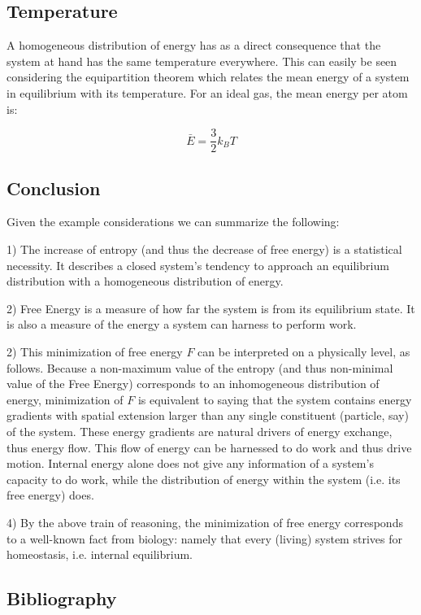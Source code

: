 \subsection{Temperature}

A homogeneous distribution of energy has as a direct consequence that the system at hand has the same temperature everywhere. This can easily be seen considering the equipartition theorem which relates the mean energy of a system in equilibrium with its temperature. For an ideal gas, the mean energy per atom is:

$$\bar{E} = \frac{3}{2}k_BT$$



\subsection{Conclusion}

Given the example considerations we can summarize the following:

1) The increase of entropy (and thus the decrease of free energy) is a statistical necessity. It describes a closed system's tendency to approach an equilibrium distribution with a homogeneous distribution of energy.

2) Free Energy is a measure of how far the system is from its equilibrium state. It is also a measure of the energy a system can harness to perform work.

2) This minimization of free energy $F$ can be interpreted on a physically level, as follows. Because a non-maximum value of the entropy (and thus non-minimal value of the Free Energy) corresponds to an inhomogeneous distribution of energy, minimization of $F$ is equivalent to saying that the system contains energy gradients with spatial extension larger than any single constituent (particle, say) of the system. These energy gradients are natural drivers of energy exchange, thus energy flow. This flow of energy can be harnessed to do work and thus drive motion. Internal energy alone does not give any information of a system's capacity to do work, while the distribution of energy within the system (i.e. its free energy) does.

4) By the above train of reasoning, the minimization of free energy corresponds to a well-known fact from biology: namely that every (living) system strives for homeostasis, i.e. internal equilibrium.


\subsection{Bibliography}

